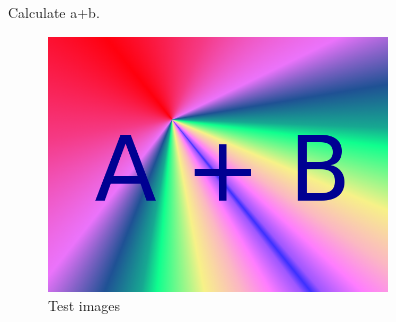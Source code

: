 Calculate a+b.
\begin{figure}[ht!]
\centering
\includegraphics[width=90mm]{image1.png}
\caption{Test images}
\label{overflow}
\end{figure}